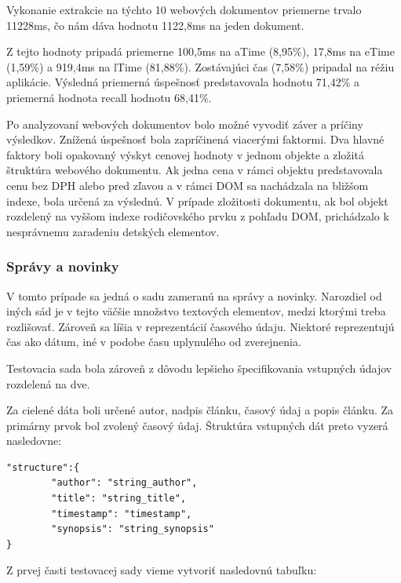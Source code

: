 Vykonanie extrakcie na týchto 10 webových dokumentov priemerne trvalo 11228ms, čo nám dáva hodnotu 1122,8ms na jeden dokument. 

Z tejto hodnoty pripadá priemerne 100,5ms na aTime (8,95\%), 17,8ms na eTime (1,59\%) a 919,4ms na lTime (81,88\%). Zostávajúci čas (7,58\%) pripadal na réžiu aplikácie. Výsledná priemerná úspešnosť predstavovala hodnotu 71,42\% a priemerná hodnota recall hodnotu 68,41\%. 

\bigskip

Po analyzovaní webových dokumentov bolo možné vyvodiť záver a príčiny výsledkov. Znížená úspešnosť bola zapríčinená viacerými faktormi. Dva hlavné faktory boli opakovaný výskyt cenovej hodnoty v jednom objekte a zložitá štruktúra webového dokumentu. Ak jedna cena v rámci objektu predstavovala cenu bez DPH alebo pred zľavou a v rámci DOM sa nachádzala na bližšom indexe, bola určená za výslednú. V prípade zložitosti dokumentu, ak bol objekt rozdelený na vyššom indexe rodičovského prvku z pohľadu DOM, prichádzalo k nesprávnemu zaradeniu detských elementov.

\newpage

\subsubsection{Správy a novinky}
\label{spravy}

V tomto prípade sa jedná o sadu zameranú na správy a novinky. Narozdiel od iných sád je v tejto väčšie množstvo textových elementov, medzi ktorými treba rozlišovať. Zároveň sa líšia v reprezentácií časového údaju. Niektoré reprezentujú čas ako dátum, iné v podobe času uplynulého od zverejnenia. 

Testovacia sada bola zároveň z dôvodu lepšieho špecifikovania vstupných údajov rozdelená na dve.

\bigskip

Za cielené dáta boli určené autor, nadpis článku, časový údaj a popis článku. Za primárny prvok bol zvolený časový údaj. Štruktúra vstupných dát preto vyzerá nasledovne:

\bigskip

\begin{lstlisting}
"structure":{
        "author": "string_author",
        "title": "string_title",
        "timestamp": "timestamp",
        "synopsis": "string_synopsis"
}
\end{lstlisting}

\bigskip

Z prvej časti testovacej sady vieme vytvoriť nasledovnú tabuľku:

